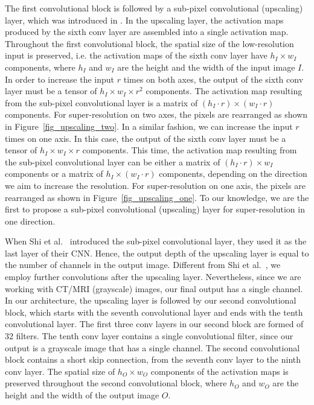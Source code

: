 \documentclass{ieeeaccess}
\begin{document}
The first convolutional block is followed by a sub-pixel convolutional (upscaling) layer, which was introduced in \cite{Shi-CVPR-2016}. In the upscaling layer, the activation maps produced by the sixth conv layer are assembled into a single activation map. Throughout the first convolutional block, the spatial size of the low-resolution input is preserved, i.e. the activation maps of the sixth conv layer have $h_I \times w_I$ components, where $h_I$ and $w_I$ are the height and the width of the input image $I$. In order to increase the input $r$ times on both axes, the output of the sixth conv layer must be a tensor of $h_I \times w_I \times r^2$ components. The activation map resulting from the sub-pixel convolutional layer is a matrix of $(h_I \cdot r) \times (w_I \cdot r)$ components. For super-resolution on two axes, the pixels are rearranged as shown in Figure~\ref{fig_upscaling_two}. In a similar fashion, we can increase the input $r$ times on one axis. In this case, the output of the sixth conv layer must be a tensor of $h_I \times w_I \times r$ components. This time, the activation map resulting from the sub-pixel convolutional layer can be either a matrix of $(h_I \cdot r) \times w_I$ components or a matrix of $h_I \times (w_I \cdot r)$ components, depending on the direction we aim to increase the resolution. For super-resolution on one axis, the pixels are rearranged as shown in Figure~\ref{fig_upscaling_one}. To our knowledge, we are the first to propose a sub-pixel convolutional (upscaling) layer for super-resolution in one direction.

When Shi et al.~\cite{Shi-CVPR-2016} introduced the sub-pixel convolutional layer, they used it as the last layer of their CNN. Hence, the output depth of the upscaling layer is equal to the number of channels in the output image. Different from Shi et al.~\cite{Shi-CVPR-2016}, we employ further convolutions after the upscaling layer. Nevertheless, since we are working with CT/MRI (grayscale) images, our final output has a single channel. In our architecture, the upscaling layer is followed by our second convolutional block, which starts with the seventh convolutional layer and ends with the tenth convolutional layer. The first three conv layers in our second block are formed of $32$ filters. The tenth conv layer contains a single convolutional filter, since our output is a grayscale image that has a single channel. The second convolutional block contains a short skip connection, from the seventh conv layer to the ninth conv layer. The spatial size of $h_O \times w_O$ components of the activation maps is preserved throughout the second convolutional block, where $h_O$ and $w_O$ are the height and the width of the output image $O$.
\end{document}

